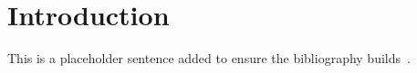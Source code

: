 \section{Introduction}

This is a placeholder sentence added to ensure the bibliography builds~\cite{dummy2026}.
